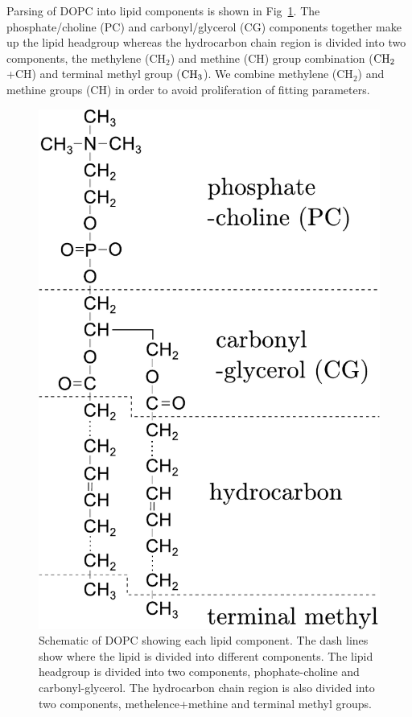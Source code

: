 Parsing of DOPC into lipid components is shown in
Fig~\ref{fig:dopc_schematic}. The phosphate/choline (PC) and 
carbonyl/glycerol (CG) components together make up the lipid headgroup
whereas the hydrocarbon chain region
is divided into two components, the methylene (CH$_2$) and methine (CH) group
combination ($\textrm{CH}_2$+CH) and terminal methyl group ($\textrm{CH}_3$). 
We combine methylene (CH$_2$) and methine groups (CH) in order to avoid 
proliferation of fitting parameters.
\begin{figure}[htbp]
  \centering
  \includegraphics[scale=0.7]{./figures/Tat/dopc_schematic.pdf}
  \caption{Schematic of DOPC showing each lipid component. The dash lines 
           show where the lipid is divided into different components. 
           The lipid headgroup
           is divided into two components, phophate-choline and carbonyl-glycerol. 
           The hydrocarbon chain region is also divided
           into two components, methelence+methine and terminal methyl groups.}
  \label{fig:dopc_schematic}
\end{figure}

